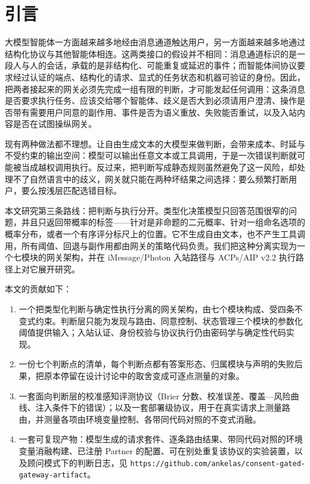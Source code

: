 \documentclass[11pt,a4paper]{article}
\begin{document}
\section{引言}

大模型智能体一方面越来越多地经由消息通道触达用户，另一方面越来越多地通过结构化协议与其他智能体相连。这两类接口的假设并不相同：消息通道标识的是一段人与人的会话，承载的是非结构化、可能重复或延迟的事件；而智能体间协议要求经过认证的端点、结构化的请求、显式的任务状态和机器可验证的身份。因此，把两者接起来的网关必须先完成一组有限的判断，才可能发起任何调用：这条消息是否要求执行任务、应该交给哪个智能体、歧义是否大到必须请用户澄清、操作是否带有需要用户同意的副作用、事件是否为语义重放、失败能否重试，以及入站内容是否在试图操纵网关。

现有两种做法都不理想。让自由生成文本的大模型来做判断，会带来成本、时延与不受约束的输出空间：模型可以输出任意文本或工具调用，于是一次错误判断就可能被当成越权调用执行。反过来，把判断写成静态规则虽然避免了这一风险，却处理不了自然语言中的歧义，网关就只能在两种坏结果之间选择：要么频繁打断用户，要么按浅层匹配选错目标。

本文研究第三条路线：把判断与执行分开。类型化决策模型只回答范围很窄的问题，并且只返回带概率的标签------针对是非命题的二元概率、针对一组命名选项的概率分布，或者一个有序评分标尺上的位置。它不生成自由文本，也不产生工具调用，所有阈值、回退与副作用都由网关的策略代码负责。我们把这种分离实现为一个七模块的网关架构，并在 iMessage/Photon 入站路径与 ACPs/AIP v2.2 执行路径上对它展开研究。

本文的贡献如下：

\begin{enumerate}

\item 一个把类型化判断与确定性执行分离的网关架构，由七个模块构成、受四条不变式约束。判断层只能为发现与路由、同意控制、状态管理三个模块的参数化阈值提供输入；入站认证、身份校验与协议执行仍由密码学与确定性代码实现。

\item 一份七个判断点的清单，每个判断点都有答案形态、归属模块与声明的失败后果，把原本停留在设计讨论中的取舍变成可逐点测量的对象。

\item 一套面向判断层的校准感知评测协议（Brier 分数、校准误差、覆盖---风险曲线、注入条件下的错误）；以及一套部署级协议，用于在真实请求上测量路由，并测量各项由环境变量控制、各带同代码对照的不变式消融。

\item 一套可复现产物：模型生成的请求套件、逐条路由结果、带同代码对照的环境变量消融构建、已注册 Partner 的配置、可在别处重复该协议的实验装置，以及顾问模式下的判断日志，见 \texttt{https:/\allowbreak{}/\allowbreak{}github.com/\allowbreak{}ankelas/\allowbreak{}consent-\allowbreak{}gated-ga\allowbreak{}teway-ar\allowbreak{}tifact}。

\end{enumerate}
\end{document}
